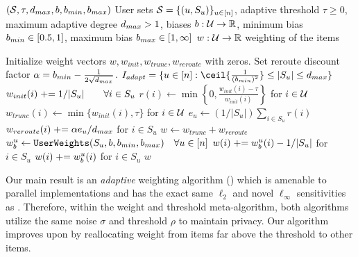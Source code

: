 \begin{algorithm}[ht]
\caption{\ouralgo$(\mathcal{S}, \tau, d_{max}, b, b_{min}, b_{max})$
 User sets $\mathcal{S} = \{(u, S_u)\}_{u \in [n]}$,
 adaptive threshold $\tau \geq 0$,
 maximum adaptive degree $d_{max} > 1$,
 biases $b: \mathcal{U} \to \mathbb{R}$,
 minimum bias $b_{min} \in [0.5,1]$, maximum bias $b_{max} \in [1,\infty]$
  $w: \mathcal{U} \to \mathbb{R}$ weighting of the items
}
\begin{algorithmic}[1]
\label{alg:max-deg}
\STATE Initialize weight vectors $w, w_{init}, w_{trunc}, w_{reroute}$ with zeros.
\STATE Set reroute discount factor $\alpha = b_{min} - \frac{1}{2\sqrt{d_{max}}}$.
\STATE $I_{adapt} = \{u \in [n]: \ceil{\frac{1}{(\bmin)^2}} \leq |S_u| \leq \dmax\}$ 
    \STATE $w_{init}(i) \mathrel{+}= 1/|S_u| \qquad \forall i \in S_u$ 
\ENDFOR
\STATE $r(i) \gets \min\left\{0, \frac{w_{init}(i) - \tau}{w_{init}(i)}\right\}$ for $i \in \mathcal{U}$ 
\STATE 
\STATE $w_{trunc}(i) \gets \min\{w_{init}(i), \tau\}$ for $i \in \mathcal{U}$  
    \STATE $e_u \gets \left(1/|S_u|\right) \sum_{i \in S_u} r(i)$ 
    \STATE $w_{reroute}(i) \mathrel{+}= \alpha e_u / d_{max}$ for $i \in S_u$ 
\ENDFOR
\STATE $w \gets w_{trunc} + w_{reroute}$ 
\STATE $w_b^u \gets \texttt{UserWeights}{}(S_u, b, b_{min}, b_{max})  \quad \forall u \in [n]$ 
    \STATE $w(i) \mathrel{+}= w_b^u(i) - 1/|S_u|$ for $i \in S_u$ 
\ENDFOR
{}
    \STATE $w(i) \mathrel{+}= w_b^u(i)$ for $i \in S_u$ 
\ENDFOR
\RETURN $w$
\end{algorithmic}
\end{algorithm}

Our main result is an \emph{adaptive} weighting algorithm \ouralgolong{} (\ouralgo{}) which is amenable to parallel implementations and has the exact same $\ell_2$ and novel $\ell_\infty$ sensitivities as \basicalgo{}. Therefore, within the weight and threshold meta-algorithm, both algorithms utilize the same noise $\sigma$ and threshold $\rho$ to maintain privacy.
Our algorithm improves upon \basicalgo{} by reallocating weight from items far above the threshold to other items.

